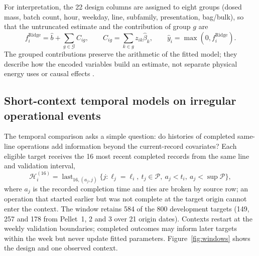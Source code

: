 For interpretation, the 22 design columns are assigned to eight groups (dosed mass, batch count, hour, weekday, line, subfamily, presentation, bag/bulk), so that the untruncated estimate and the contribution of group $g$ are
\begin{equation}
 f_i^{\mathrm{Ridge}}=\widehat b+\sum_{g\in\mathcal G}C_{ig},\qquad
 C_{ig}=\sum_{k\in g}z_{ik}\widehat\beta_k,\qquad
 \widehat y_i=\max(0,f_i^{\mathrm{Ridge}}).
 \label{eq:explain}
\end{equation}
The grouped contributions preserve the arithmetic of the fitted model; they describe how the encoded variables build an estimate, not separate physical energy uses or causal effects \citep{rudin2019,aas2021,fisher2019}.

\subsection{Short-context temporal models on irregular operational events}
The temporal comparison asks a simple question: do histories of completed same-line operations add information beyond the current-record covariates? Each eligible target receives the 16 most recent completed records from the same line and validation interval,
\begin{equation}
 \mathcal H_i^{(16)}=\operatorname{last}_{16,(a_j,j)}
 \{j:\ell_j=\ell_i,\ t_j\in\mathcal P,\ a_j<t_i,\ a_j<\sup\mathcal P\},
 \label{eq:window}
\end{equation}
where $a_j$ is the recorded completion time and ties are broken by source row; an operation that started earlier but was not complete at the target origin cannot enter the context. The window retains 584 of the 800 development targets (149, 257 and 178 from Pellet~1, 2 and 3 over 21 origin dates). Contexts restart at the weekly validation boundaries; completed outcomes may inform later targets within the week but never update fitted parameters. Figure~\ref{fig:windows} shows the design and one observed context.


